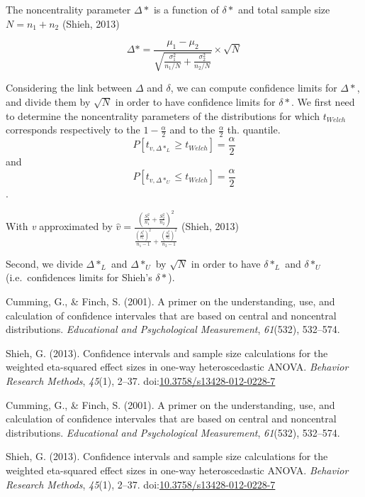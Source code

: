 \documentclass[
  man,floatsintext]{apa6}
\begin{document}
The noncentrality parameter \(\Delta*\) is a function of \(\delta*\) and total sample size \(N = n_1 + n_2\) (Shieh, 2013)

\begin{equation}
\Delta* = \frac{\mu_1-\mu_2}{\sqrt{\frac{\sigma_1^2}{n_1/N}+\frac{\sigma_2^2}{n_2/N}}} \times \sqrt{N}
\label{eq:ncp}
\end{equation}

Considering the link between \(\Delta\) and \(\delta\), we can compute confidence limits for \(\Delta*\), and divide them by \(\sqrt{N}\) in order to have confidence limits for \(\delta*\). We first need to determine the noncentrality parameters of the distributions for which \(t_{Welch}\) corresponds respectively to the \(1-\frac{\alpha}{2}\) and to the \(\frac{\alpha}{2}\) th. quantile.
\[P[t_{v, \Delta*_L} \geq t_{Welch}] = \frac{\alpha}{2} \] and
\[P[t_{v, \Delta*_U} \leq t_{Welch}] = \frac{\alpha}{2} \].

With \emph{v} approximated by \(\hat{v} = \frac{(\frac{S_1^2}{n_1}+\frac{S_2^2}{n_2})^2}{\frac{(\frac{S_1^2}{n_1})^2}{n_1-1}+\frac{(\frac{S_2^2}{n_2})^2}{n_2-1}}\) (Shieh, 2013)

Second, we divide \(\Delta*_L\) and \(\Delta*_U\) by \(\sqrt{N}\) in order to have \(\delta*_L\) and \(\delta*_U\) (i.e.~confidences limits for Shieh's \(\delta*\)).

\hypertarget{refs}{}
\leavevmode\hypertarget{ref-Cumming_Finch_2001}{}%
Cumming, G., \& Finch, S. (2001). A primer on the understanding, use, and calculation of confidence intervales that are based on central and noncentral distributions. \emph{Educational and Psychological Measurement}, \emph{61}(532), 532--574.

\leavevmode\hypertarget{ref-Shieh_2013}{}%
Shieh, G. (2013). Confidence intervals and sample size calculations for the weighted eta-squared effect sizes in one-way heteroscedastic ANOVA. \emph{Behavior Research Methods}, \emph{45}(1), 2--37. doi:\href{https://doi.org/10.3758/s13428-012-0228-7}{10.3758/s13428-012-0228-7}

\leavevmode\hypertarget{ref-Cumming_Finch_2001}{}%
Cumming, G., \& Finch, S. (2001). A primer on the understanding, use, and calculation of confidence intervales that are based on central and noncentral distributions. \emph{Educational and Psychological Measurement}, \emph{61}(532), 532--574.

\leavevmode\hypertarget{ref-Shieh_2013}{}%
Shieh, G. (2013). Confidence intervals and sample size calculations for the weighted eta-squared effect sizes in one-way heteroscedastic ANOVA. \emph{Behavior Research Methods}, \emph{45}(1), 2--37. doi:\href{https://doi.org/10.3758/s13428-012-0228-7}{10.3758/s13428-012-0228-7}
\end{document}
